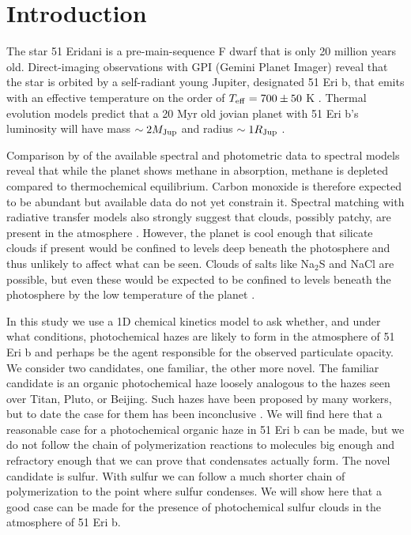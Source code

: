 \documentclass[preprint]{aastex}
\newcounter{reaction}
\begin{document}

 \linenumbers
\section{Introduction}

The star 51 Eridani is a pre-main-sequence F dwarf that is only 20 million years old.  
Direct-imaging observations with GPI (Gemini Planet Imager)
 reveal that the star is orbited by a self-radiant young Jupiter, designated 51 Eri b, that emits with
an effective temperature on the order of $T_{\rm eff} = 700 \pm 50$ K \citep{Macintosh2015}.
Thermal evolution models predict that a 20 Myr old jovian planet with 51 Eri b's luminosity will
have mass $\sim 2 M_{\rm Jup}$ and radius $\sim 1 R_{\rm Jup}$ \citep{Macintosh2015}. 

Comparison by \citet{Macintosh2015} of the available spectral and photometric data to spectral models reveal
that while the planet shows methane in absorption, methane is depleted compared to 
thermochemical equilibrium. Carbon monoxide is therefore expected to be abundant
but available data do not yet constrain it.
Spectral matching with radiative transfer models also strongly suggest that clouds, possibly patchy, are present in the atmosphere \citep{Macintosh2015}.
However, the planet is cool enough that silicate clouds 
if present would be confined to levels deep beneath the photosphere and thus unlikely to affect what can be seen. %
Clouds of salts like Na$_2$S and NaCl are possible, but even these would be expected
to be confined to levels beneath the photosphere 
by the low temperature of the planet \citep{Morley2012}.

In this study we use a 1D chemical kinetics model to ask whether, and under what conditions,
photochemical hazes are likely to form in the atmosphere of 51 Eri b
and perhaps be the agent responsible for the observed particulate opacity.
We consider two candidates, one familiar, the other more novel.
The familiar candidate is an organic photochemical haze loosely analogous to the hazes seen over Titan,
Pluto, or Beijing.
Such hazes have been proposed by many workers, but to date
the case for them has been inconclusive \citep{Moses2014}.
We will find here that a reasonable case for a photochemical organic haze in 51 Eri b can be made, but we do not follow the chain
of polymerization reactions to molecules big enough and refractory enough that we can prove that condensates actually form.   
The novel candidate is sulfur. 
With sulfur we can follow a much shorter chain of polymerization to the point where sulfur condenses.
We will show here that a good case
can be made for the presence of photochemical sulfur clouds in the atmosphere of 51 Eri b. %
\end{document}
